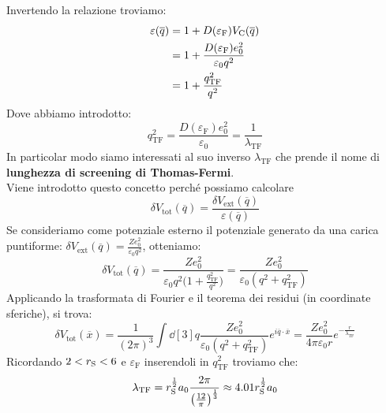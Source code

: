 Invertendo la relazione troviamo:
\begin{equation*}
    \begin{aligned}
        \varepsilon(\overline q) &=1+D(\varepsilon_{\text F})V_{\text{C}}(\overline q) \\
        & = 1+\frac{D(\varepsilon_{\text F})e_0^2}{\varepsilon_0 q^2} \\
        & = 1+ \frac{q_{\text{TF}}^2}{q^2}
    \end{aligned}
\end{equation*}
Dove abbiamo introdotto:
\begin{equation*}
    q_{\text{TF}}^2=\frac{D(\varepsilon_{\text{F}})e_0^2}{\varepsilon_0}=\frac{1}{\lambda_{\text{TF}}}
\end{equation*}
In particolar modo siamo interessati al suo inverso $\lambda_{\text{TF}}$ che prende il nome di \textbf{lunghezza di screening di Thomas-Fermi}. \\
Viene introdotto questo concetto perché possiamo calcolare
\begin{equation*}
    \delta V_{\text{tot}}(\overline q)=\frac{\delta V_{\text{ext}}(\overline q)}{\varepsilon(\overline q)}
\end{equation*}
Se consideriamo come potenziale esterno il potenziale generato da una carica puntiforme: $\delta V_{\text{ext}}(\overline q)=\frac{Ze_0^2}{\varepsilon_0 q^2}$, otteniamo:
\begin{equation*}
    \delta V_{\text{tot}}(\overline q)=\frac{Ze_0^2}{\varepsilon_0q^2\bigg(1+\frac{q_{\text{TF}}^2}{q^2}\bigg)}=\frac{Ze_0^2}{\varepsilon_0(q^2+q_{\text{TF}}^2)}
\end{equation*}
Applicando la trasformata di Fourier e il teorema dei residui (in coordinate sferiche), si trova:
\begin{equation*}
    \delta V_\text{tot}(\overline x)=\frac{1}{(2\pi)^3}\int\dd[3]{q}\frac{Ze_0^2}{\varepsilon_0(q^2+q_{\text{TF}}^2)}e^{i \overline q \cdot \overline x} = \frac{Ze_0^2}{4\pi\varepsilon_0r}e^{-\frac r {\lambda_{\text{TF}}}}
\end{equation*}
Ricordando $2 < r_{\text S} < 6$ e $\varepsilon_\text{F}$ inserendoli in $q_{\text{TF}}^2$ troviamo che:
\begin{equation*}
    \lambda_{\text{TF}}=r_{\text S}^{\frac 12}a_0\frac{2\pi}{\big(\frac{12}{\pi}\big)^\frac 13}\approx 4.01 r_{\text S}^{\frac 12}a_0
\end{equation*}
